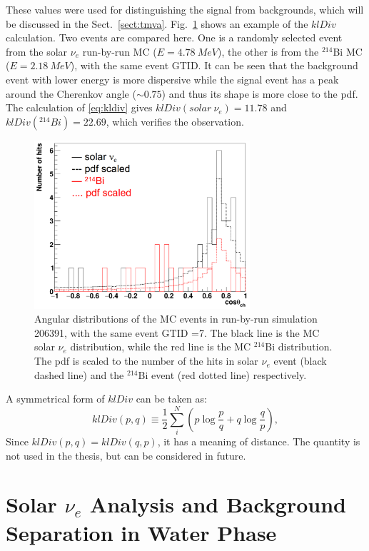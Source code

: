 These values were used for distinguishing the signal from backgrounds, which will be discussed in the Sect.~\ref{sect:tmva}. Fig.~\ref{kLdiv_example} shows an example of the $klDiv$ calculation. Two events are compared here. One is a randomly selected event from the solar $\nu_e$ run-by-run MC ($E=4.78~MeV$), the other is from the $^{214}$Bi MC ($E=2.18~MeV$), with the same event GTID. It can be seen that the background event with lower energy is more dispersive while the signal event has a peak around the Cherenkov angle ($\sim 0.75$) and thus its shape is more close to the pdf. The calculation of \ref{eq:kldiv} gives $klDiv(solar~\nu_e)=11.78$ and $klDiv(^{214}Bi)=22.69$, which verifies the observation.

\begin{figure}[!htb]
	\centering
	\includegraphics[width=8cm]{klDiv_example.png}
	\caption{Angular distributions of the MC events in run-by-run simulation 206391, with the same event GTID =7. The black line is the MC solar $\nu_e$ distribution, while the red line is the MC $^{214}$Bi distribution. The pdf is scaled to the number of the hits in solar $\nu_e$ event (black dashed line) and the $^{214}$Bi event (red dotted line) respectively.}
	\label{kLdiv_example}
\end{figure}

A symmetrical form of $klDiv$ can be taken as:
\begin{equation}
klDiv(p,q) \equiv \frac{1}{2}\sum_{i}^N (p\log{\frac{p}{q}}+q\log{\frac{q}{p}}),
\end{equation}
Since $klDiv(p,q)=klDiv(q,p)$, it has a meaning of distance. The quantity is not used in the thesis, but can be considered in future.

\section{Solar \texorpdfstring{$\nu_e$}{Lg} Analysis and Background Separation in Water Phase}
